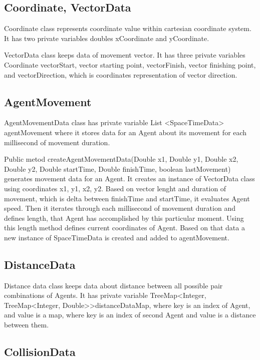 \documentclass[thesis=B,english]{FITthesis}[2019/12/23]
\begin{document}
\subsection{Coordinate, VectorData}

Coordinate class represents coordinate value within cartesian coordinate system. It has two private variables doubles xCoordinate and yCoordinate.

VectorData class keeps data of movement vector. It has three private variables Coordinate vectorStart, vector starting point, vectorFinish, vector finishing point, and vectorDirection, which is coordinates representation of vector direction.

\subsection{AgentMovement}

AgentMovementData class has private variable List \textless SpaceTimeData> agentMovement where it stores data for an Agent about its movement for each millisecond of movement duration.

Public metod createAgentMovementData(Double x1, Double y1, Double x2, Double y2,  Double startTime, Double finishTime, boolean lastMovement) generates movement data for an Agent. It creates an instance of VectorData class using coordinates x1, y1, x2, y2. Based on vector lenght and duration of movement, which is delta between finishTime and startTime, it evaluates Agent speed. Then it iterates through each millisecond of movement duration and defines length, that Agent has accomplished by this particular moment. Using this length method defines current coordinates of Agent. Based on that data a new instance of SpaceTimeData is created and added to agentMovement.

\subsection{DistanceData}

Distance data class keeps data about distance between all possible pair combinations of Agents. It has private variable TreeMap\textless Integer, TreeMap\textless Integer, Double\textgreater\textgreater distanceDataMap, where key is an index of Agent, and value is a map, where key is an index of second Agent and value is a distance between them. 

\subsection{CollisionData}
\end{document}
